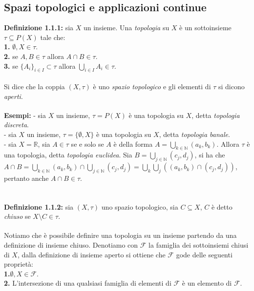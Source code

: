 \documentclass{article}
\begin{document}
\subsection{Spazi topologici e applicazioni continue}
\textbf{Definizione 1.1.1:} sia $X$ un insieme. Una \textit{topologia} su $X$ è un sottoinsieme $\tau \subseteq P(X)$ tale che: \\
\textbf{1.} $\emptyset, X \in \tau$. \\
\textbf{2.} se $A, B \in \tau$ allora $A \cap B \in \tau$. \\
\textbf{3.} se $\{ A_i \}_{i \in I} \subset \tau$ allora $\bigcup_{i \in I} A_i \in \tau$. \\ \\
Si dice che la coppia $(X, \tau)$ è uno \textit{spazio topologico} e gli elementi di $\tau$ si dicono \textit{aperti}. \\ \\
\textbf{Esempi:} - sia $X$ un insieme, $\tau = P(X)$ è una topologia su $X$, detta \textit{topologia discreta}. \\
- sia $X$ un insieme, $\tau = \{ \emptyset, X \}$ è una topologia su $X$, detta \textit{topologia banale}. \\
- sia $X = \mathbb{R}$, sia $A \in \tau$ se e solo se $A$ è della forma $A = \bigcup_{k \in \mathbb{N}} (a_k, b_k)$. Allora $\tau$ è una topologia, detta \textit{topologia euclidea}. Sia $B = \bigcup_{j \in \mathbb{N}} (c_j, d_j)$, si ha che $A \cap B = \bigcup_{k \in \mathbb{N}} (a_k, b_k) \cap \bigcup_{j \in \mathbb{N}} (c_j, d_j) = \bigcup_k \bigcup_j ((a_k, b_k) \cap (c_j, d_j))$, pertanto anche $A \cap B \in \tau$. \\ \\ \\
\textbf{Definizione 1.1.2:} sia $(X, \tau)$ uno spazio topologico, sia $C \subseteq X$, $C$ è detto \textit{chiuso} se $X \setminus C \in \tau$. \\ \\
Notiamo che è possibile definire una topologia su un insieme partendo da una definizione di insieme chiuso. Denotiamo con $\mathcal{F}$ la famiglia dei sottoinsiemi chiusi di $X$, dalla definizione di insieme aperto si ottiene che $\mathcal{F}$ gode delle seguenti proprietà: \\
\textbf{1.}$\emptyset, X \in \mathcal{F}$. \\
\textbf{2.} L'intersezione di una qualsiasi famiglia di elementi di $\mathcal{F}$ è un elemento di $\mathcal{F}$. \\
\end{document}
